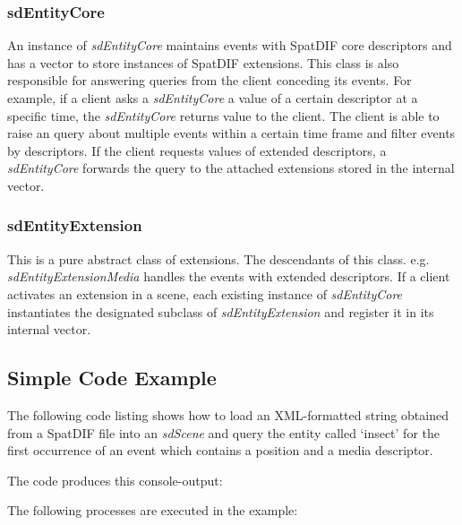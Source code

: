 \documentclass[a4paper]{article}
\begin{document}
\subsubsection{sdEntityCore}
An instance of {\it sdEntityCore} maintains events with SpatDIF core descriptors and has a vector to store instances of SpatDIF extensions. 
This class is also responsible for answering queries from the client conceding its events. For example, if a client asks a {\it sdEntityCore} a value of a certain descriptor at a specific time, the {\it sdEntityCore} returns value to the client. 
The client is able to raise an query about multiple events within a certain time frame and filter events by descriptors. If the client requests values of extended descriptors, a {\it sdEntityCore} forwards the query to the attached extensions stored in the internal vector.

\subsubsection{sdEntityExtension}
This is a pure abstract class of extensions. The descendants of this class. e.g. {\it sdEntityExtensionMedia} handles the events with extended descriptors. 
If a client activates an extension in a scene, each existing instance of {\it sdEntityCore} instantiates the designated subclass of {\it sdEntityExtension} and register it in its internal vector.

\subsection{Simple Code Example}
The following code listing shows how to load an XML-formatted string obtained from a SpatDIF file into an {\it sdScene} and query the entity called `insect' for the first occurrence of an event which contains a position and a media descriptor.

\vfill

 


\noindent The code produces this console-output: 
 

\noindent 
The following processes are executed in the example:
\end{document}
